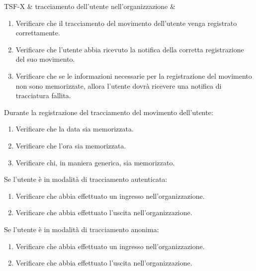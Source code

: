TSF-X & tracciamento dell'utente nell'organizzazione & \begin{enumerate}
    \item Verificare che il tracciamento del movimento dell'utente venga registrato correttamente.
    \item Verificare che l'utente abbia ricevuto la notifica della corretta registrazione del suo movimento.
    \item Verificare che se le informazioni necessarie per la registrazione del movimento non sono memorizzate, allora l'utente dovrà ricevere una notifica di tracciatura fallita.
\end{enumerate}
Durante la registrazione del tracciamento del movimento dell'utente:
\begin{enumerate}
    \item Verificare che la data sia memorizzata.
    \item Verificare che l'ora sia memorizzata.
    \item Verificare chi, in maniera generica, sia memorizzato.
\end{enumerate}
Se l'utente è in modalità di tracciamento autenticata:
\begin{enumerate}
    \item Verificare che abbia effettuato un ingresso nell'organizzazione.
    \item Verificare che abbia effettuato l'uscita nell'organizzazione.
\end{enumerate}
Se l'utente è in modalità di tracciamento anonima:
\begin{enumerate}
    \item Verificare che abbia effettuato un ingresso nell'organizzazione.
    \item Verificare che abbia effettuato l'uscita nell'organizzazione.
\end{enumerate} \\

